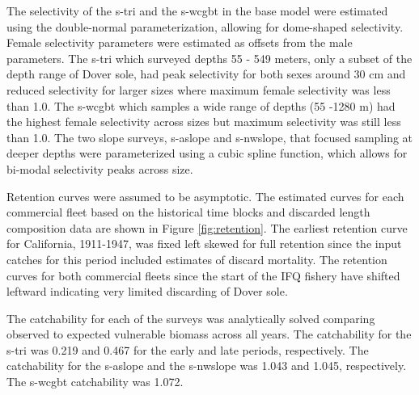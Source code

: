 \documentclass[11pt,
  english,
  a4paper,
]{article}
\begin{document}
\leavevmode\tagmcend\tagstructend\par


The selectivity of the \gls{s-tri} and the \gls{s-wcgbt} in the base model were estimated using the double-normal parameterization, allowing for dome-shaped selectivity. Female selectivity parameters were estimated as offsets from the male parameters. The \gls{s-tri} which surveyed depths 55 - 549 meters, only a subset of the depth range of Dover sole, had peak selectivity for both sexes around 30 cm and reduced selectivity for larger sizes where maximum female selectivity was less than 1.0. The \gls{s-wcgbt} which samples a wide range of depths (55 -1280 m) had the highest female selectivity across sizes but maximum selectivity was still less than 1.0. The two slope surveys, \gls{s-aslope} and \gls{s-nwslope}, that focused sampling at deeper depths were parameterized using a cubic spline function, which allows for bi-modal selectivity peaks across size.

\leavevmode\tagmcend\tagstructend\par


Retention curves were assumed to be asymptotic. The estimated curves for each commercial fleet based on the historical time blocks and discarded length composition data are shown in Figure \ref{fig:retention}. The earliest retention curve for California, 1911-1947, was fixed left skewed for full retention since the input catches for this period included estimates of discard mortality. The retention curves for both commercial fleets since the start of the IFQ fishery have shifted leftward indicating very limited discarding of Dover sole.

\leavevmode\tagmcend\tagstructend\par


The catchability for each of the surveys was analytically solved comparing observed to expected vulnerable biomass across all years. The catchability for the \gls{s-tri} was 0.219 and 0.467 for the early and late periods, respectively. The catchability for the \gls{s-aslope} and the \gls{s-nwslope} was 1.043 and 1.045, respectively. The \gls{s-wcgbt} catchability was 1.072.

\leavevmode\tagmcend\tagstructend\par
\end{document}
